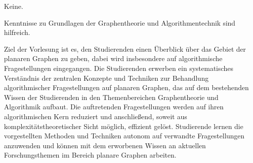 \begin{course}

\setdoclanguagegerman
{}



\coursehead


\label{cour_6159.dp_997}


\begin{styleenv}
\begin{assessment}

\end{assessment}

\begin{conditions}Keine.\end{conditions}

\begin{recommendations}Kenntnisse zu Grundlagen der Graphentheorie und Algorithmentechnik sind hilfreich.

\end{recommendations}
\end{styleenv}

\begin{learningoutcomes}
Ziel der Vorlesung ist es, den Studierenden einen Überblick über das Gebiet der planaren Graphen zu geben, dabei wird insbesondere auf algorithmische Fragestellungen eingegangen. Die Studierenden erwerben ein systematisches Verständnis der zentralen Konzepte und Techniken zur Behandlung algorithmischer Fragestellungen auf planaren Graphen, das auf dem bestehenden Wissen der Studierenden in den Themenbereichen Graphentheorie und Algorithmik aufbaut. Die auftretenden Fragestellungen werden auf ihren algorithmischen Kern reduziert und anschließend, soweit aus komplexitätstheoretischer Sicht möglich, effizient gelöst. Studierende lernen die vorgestellten Methoden und Techniken autonom auf verwandte Fragestellungen anzuwenden und können mit dem erworbenen Wissen an aktuellen Forschungsthemen im Bereich planare Graphen arbeiten.



\end{learningoutcomes}
\end{course}
